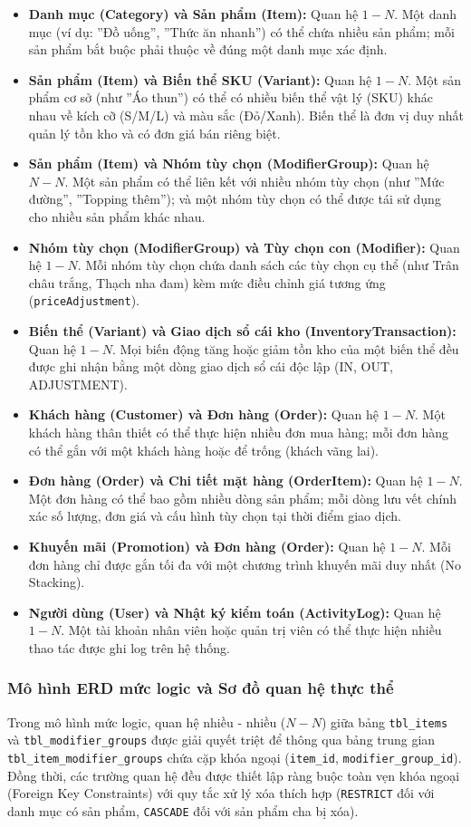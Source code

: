 \begin{itemize}[leftmargin=1.5cm]
    \item \textbf{Danh mục (Category) và Sản phẩm (Item):} Quan hệ $1-N$. Một danh mục (ví dụ: ''Đồ uống'', ''Thức ăn nhanh'') có thể chứa nhiều sản phẩm; mỗi sản phẩm bắt buộc phải thuộc về đúng một danh mục xác định.
    \item \textbf{Sản phẩm (Item) và Biến thể SKU (Variant):} Quan hệ $1-N$. Một sản phẩm cơ sở (như ''Áo thun'') có thể có nhiều biến thể vật lý (SKU) khác nhau về kích cỡ (S/M/L) và màu sắc (Đỏ/Xanh). Biến thể là đơn vị duy nhất quản lý tồn kho và có đơn giá bán riêng biệt.
    \item \textbf{Sản phẩm (Item) và Nhóm tùy chọn (ModifierGroup):} Quan hệ $N-N$. Một sản phẩm có thể liên kết với nhiều nhóm tùy chọn (như ''Mức đường'', ''Topping thêm''); và một nhóm tùy chọn có thể được tái sử dụng cho nhiều sản phẩm khác nhau.
    \item \textbf{Nhóm tùy chọn (ModifierGroup) và Tùy chọn con (Modifier):} Quan hệ $1-N$. Mỗi nhóm tùy chọn chứa danh sách các tùy chọn cụ thể (như Trân châu trắng, Thạch nha đam) kèm mức điều chỉnh giá tương ứng (\texttt{priceAdjustment}).
    \item \textbf{Biến thể (Variant) và Giao dịch sổ cái kho (InventoryTransaction):} Quan hệ $1-N$. Mọi biến động tăng hoặc giảm tồn kho của một biến thể đều được ghi nhận bằng một dòng giao dịch sổ cái độc lập (IN, OUT, ADJUSTMENT).
    \item \textbf{Khách hàng (Customer) và Đơn hàng (Order):} Quan hệ $1-N$. Một khách hàng thân thiết có thể thực hiện nhiều đơn mua hàng; mỗi đơn hàng có thể gắn với một khách hàng hoặc để trống (khách vãng lai).
    \item \textbf{Đơn hàng (Order) và Chi tiết mặt hàng (OrderItem):} Quan hệ $1-N$. Một đơn hàng có thể bao gồm nhiều dòng sản phẩm; mỗi dòng lưu vết chính xác số lượng, đơn giá và cấu hình tùy chọn tại thời điểm giao dịch.
    \item \textbf{Khuyến mãi (Promotion) và Đơn hàng (Order):} Quan hệ $1-N$. Mỗi đơn hàng chỉ được gắn tối đa với một chương trình khuyến mãi duy nhất (No Stacking).
    \item \textbf{Người dùng (User) và Nhật ký kiểm toán (ActivityLog):} Quan hệ $1-N$. Một tài khoản nhân viên hoặc quản trị viên có thể thực hiện nhiều thao tác được ghi log trên hệ thống.
\end{itemize}

\subsubsection{Mô hình ERD mức logic và Sơ đồ quan hệ thực thể}
Trong mô hình mức logic, quan hệ nhiều - nhiều ($N-N$) giữa bảng \texttt{tbl\_items} và \texttt{tbl\_modifier\_groups} được giải quyết triệt để thông qua bảng trung gian \texttt{tbl\_item\_modifier\_groups} chứa cặp khóa ngoại (\texttt{item\_id}, \texttt{modifier\_group\_id}). Đồng thời, các trường quan hệ đều được thiết lập ràng buộc toàn vẹn khóa ngoại (Foreign Key Constraints) với quy tắc xử lý xóa thích hợp (\texttt{RESTRICT} đối với danh mục có sản phẩm, \texttt{CASCADE} đối với sản phẩm cha bị xóa).

